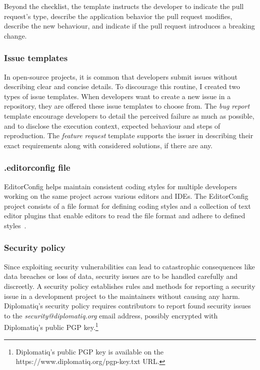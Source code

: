 Beyond the checklist, the template instructs the developer to indicate the pull request's type, describe the application behavior the pull request modifies, describe the new behaviour, and indicate if the pull request introduces a breaking change.

\subsubsection{Issue templates}

In open-source projects, it is common that developers submit issues without describing clear and concise details. To discourage this routine, I created two types of issue templates. When developers want to create a new issue in a repository, they are offered these issue templates to choose from. The \emph{bug report} template encourage developers to detail the perceived failure as much as possible, and to disclose the execution context, expected behaviour and steps of reproduction. The \emph{feature request} template supports the issuer in describing their exact requirements along with considered solutions, if there are any.

\subsubsection{.editorconfig file}

EditorConfig helps maintain consistent coding styles for multiple developers working on the same project across various editors and IDEs. The EditorConfig project consists of a file format for defining coding styles and a collection of text editor plugins that enable editors to read the file format and adhere to defined styles~\cite{editorconfig}.

\subsubsection{Security policy}

Since exploiting security vulnerabilities can lead to catastrophic consequences like data breaches or loss of data, security issues are to be handled carefully and discreetly. A security policy establishes rules and methods for reporting a security issue in a development project to the maintainers without causing any harm. Diplomatiq's security policy requires contributors to report found security issues to the \emph{security@diplomatiq.org} email address, possibly encrypted with Diplomatiq's public PGP key.\footnote{Diplomatiq's public PGP key is available on the https://www.diplomatiq.org/pgp-key.txt URL.}

